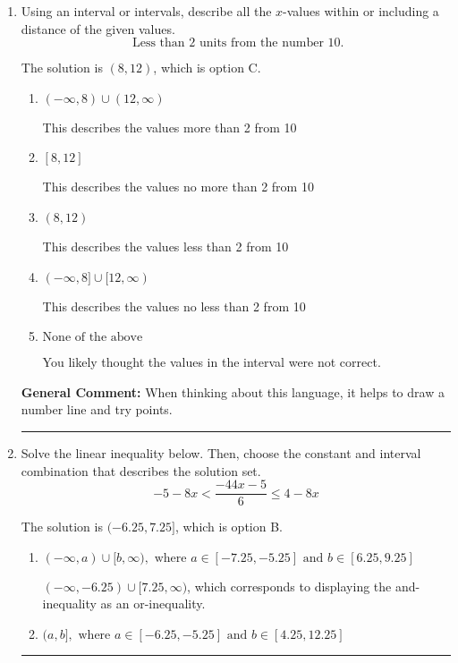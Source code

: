 \documentclass{extbook}[14pt]
\newcommand{\litem}[1]{\item #1

\rule{\textwidth}{0.4pt}}
\begin{document}
\begin{enumerate}
{\begin{enumerate}[label=\Alph*.]
This describes the values no more than 1 from 7
\item \( \text{None of the above} \)

Options A-D described the values [more/less than] 1 units from 7, which is the reverse of what the question asked.
\end{enumerate}

\textbf{General Comment:} When thinking about this language, it helps to draw a number line and try points.
}
\litem{
Using an interval or intervals, describe all the $x$-values within or including a distance of the given values.
\[ \text{ Less than } 2 \text{ units from the number } 10. \]

The solution is \( (8, 12) \), which is option C.\begin{enumerate}[label=\Alph*.]
\item \( (-\infty, 8) \cup (12, \infty) \)

This describes the values more than 2 from 10
\item \( [8, 12] \)

This describes the values no more than 2 from 10
\item \( (8, 12) \)

This describes the values less than 2 from 10
\item \( (-\infty, 8] \cup [12, \infty) \)

This describes the values no less than 2 from 10
\item \( \text{None of the above} \)

You likely thought the values in the interval were not correct.
\end{enumerate}

\textbf{General Comment:} When thinking about this language, it helps to draw a number line and try points.
}
\litem{
Solve the linear inequality below. Then, choose the constant and interval combination that describes the solution set.
\[ -5 - 8 x < \frac{-44 x - 5}{6} \leq 4 - 8 x \]

The solution is \( (-6.25, 7.25] \), which is option B.\begin{enumerate}[label=\Alph*.]
\item \( (-\infty, a) \cup [b, \infty), \text{ where } a \in [-7.25, -5.25] \text{ and } b \in [6.25, 9.25] \)

$(-\infty, -6.25) \cup [7.25, \infty)$, which corresponds to displaying the and-inequality as an or-inequality.
\item \( (a, b], \text{ where } a \in [-6.25, -5.25] \text{ and } b \in [4.25, 12.25] \)


\end{enumerate}}
\end{enumerate}
\end{document}
